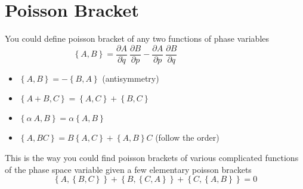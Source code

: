 \section{Poisson Bracket}
You could define poisson bracket of any two functions of phase variables 
$$\left\lbrace A,B\right\rbrace =\frac{\partial A}{\partial \dot{q}}\ \frac{\partial B}{\partial p}-\frac{\partial A}{\partial p}\ \frac{\partial B}{\partial q}\hspace{3cm}$$
\begin{itemize}
	\item $\left\lbrace A,B\right\rbrace =-\left\lbrace B,A\right\rbrace $ \quad (antisymmetry)\\
	\item $\left\lbrace A+B,C\right\rbrace =\left\lbrace A,C\right\rbrace +\left\lbrace B,C\right\rbrace $
	\item $\left\lbrace \alpha \ A,B\right\rbrace =\alpha\left\lbrace A,B\right\rbrace $
	\item $\left\lbrace A,B C\right\rbrace=B\left\lbrace A,C \right\rbrace+\left\lbrace A,B\right\rbrace C  $ (follow the order)
\end{itemize}
This is the way you could find poisson brackets of various complicated functions of the phase space variable given a few elementary poisson brackets 
$$\left\lbrace A ,\left\lbrace B,C \right\rbrace \right\rbrace +\left\lbrace B ,\left\lbrace C,A \right\rbrace \right\rbrace +\left\lbrace C,\left\lbrace A,B \right\rbrace \right\rbrace =0$$
